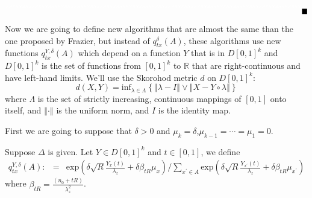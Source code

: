 \documentclass[11pt,english]{article}
\begin{document}
${\color{white}sssssssssssssssssssssssssssssssssssssssssssssssssssssssssssssssssssssssssssssssssssssssssssss}$$\;\;\;\;\;\;\;\;\;\;\;\;\;\;\;\;\;\;\;\;\;\;\;\;\;\;\;\;\;\;\;\;\;\;\;\;\;\;\;\;\;\;\;\;\;\;\;\;\;\;\;\;\;\;\;\;\;\;\;\;\;\;\;\;\;\;\;\;\;\;\;\;\;\;\;\;\;\;\;\;\;\;\;\;\;\;\;\;\;\;\;\;\;\;\;\;\;\;\;\;\;\;\;\;\;\;\;\;\;\;\;\;\;\;\;\;\;\;\;\;\;\;\;\;\;\;\;\;\;\;\;\;\;\;\;\;\;\;\;\text{\ensuremath{\blacksquare}}$

Now we are going to define new algorithms that are almost the same
than the one proposed by Frazier, but instead of $q_{tx}^{\delta}\left(A\right)$,
these algorithms use new functions $q_{tx}^{Y,\delta}\left(A\right)$
which depend on a function $Y$ that is in $D\left[0,1\right]^{k}$
and $D\left[0,1\right]^{k}$ is the set of functions from $\left[0,1\right]^{k}$
to $\mathbb{R}$ that are right-continuous and have left-hand limits.
We'll use the Skorohod metric $d$ on $D\left[0,1\right]^{k}$:
\[
d\left(X,Y\right)=\mbox{inf}_{\lambda\in\Lambda}\left\{ \left\Vert \lambda-I\right\Vert \vee\left\Vert X-Y\circ\lambda\right\Vert \right\} 
\]
where $\Lambda$ is the set of strictly increasing, continuous mappings
of $\left[0,1\right]$ onto itself, and $\left\Vert \cdot\right\Vert $
is the uniform norm, and $I$ is the identity map. 

First we are going to suppose that $\delta>0$ and $\mu_{k}=\delta$,$\mu_{k-1}=\cdots=\mu_{\text{1}}=0$.

Suppose $\Delta$ is given. Let$ $ $Y\in D\left[0,1\right]^{k}$
and $t\in\left[0,1\right]$, we define
\begin{eqnarray*}
q_{tx}^{Y,\delta}\left(A\right): & = & \mbox{exp}\left(\delta\sqrt{R}\frac{Y_{x}\left(t\right)}{\lambda_{z}}+\delta\beta_{tR}\mu_{x}\right)/\sum_{x^{'}\in A}\mbox{exp}\left(\delta\sqrt{R}\frac{Y_{x^{'}}\left(t\right)}{\lambda_{z}}+\delta\beta_{tR}\mu_{x^{'}}\right)
\end{eqnarray*}
where $\beta_{tR}=\frac{\left(n_{0}+tR\right)}{\lambda_{z}^{2}}$.
\end{document}
